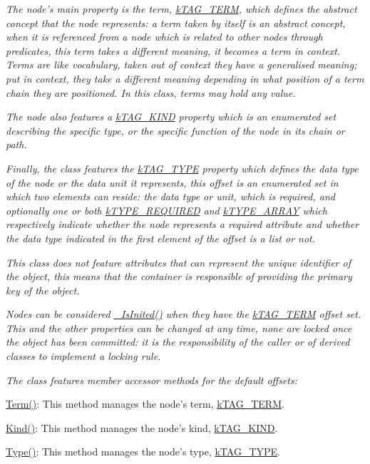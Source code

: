 {\itshape The node's main property is the term, \hyperlink{}{k\-T\-A\-G\-\_\-\-T\-E\-R\-M}, which defines the abstract concept that the node represents\-: a term taken by itself is an abstract concept, when it is referenced from a node which is related to other nodes through predicates, this term takes a different meaning, it becomes a term in context. Terms are like vocabulary, taken out of context they have a generalised meaning; put in context, they take a different meaning depending in what position of a term chain they are positioned. In this class, terms may hold any value.}

{\itshape The node also features a \hyperlink{}{k\-T\-A\-G\-\_\-\-K\-I\-N\-D} property which is an enumerated set describing the specific type, or the specific function of the node in its chain or path.}

{\itshape Finally, the class features the \hyperlink{}{k\-T\-A\-G\-\_\-\-T\-Y\-P\-E} property which defines the data type of the node or the data unit it represents, this offset is an enumerated set in which two elements can reside\-: the data type or unit, which is required, and optionally one or both \hyperlink{}{k\-T\-Y\-P\-E\-\_\-\-R\-E\-Q\-U\-I\-R\-E\-D} and \hyperlink{}{k\-T\-Y\-P\-E\-\_\-\-A\-R\-R\-A\-Y} which respectively indicate whether the node represents a required attribute and whether the data type indicated in the first element of the offset is a list or not.}

{\itshape This class does not feature attributes that can represent the unique identifier of the object, this means that the container is responsible of providing the primary key of the object.}

{\itshape Nodes can be considered \hyperlink{}{\-\_\-\-Is\-Inited()} when they have the \hyperlink{}{k\-T\-A\-G\-\_\-\-T\-E\-R\-M} offset set. This and the other properties can be changed at any time, none are locked once the object has been committed\-: it is the responsibility of the caller or of derived classes to implement a locking rule.}

{\itshape The class features member accessor methods for the default offsets\-:}

{\itshape 
\begin{DoxyItemize}
\item \hyperlink{}{Term()}\-: This method manages the node's term, \hyperlink{}{k\-T\-A\-G\-\_\-\-T\-E\-R\-M}. 
\item \hyperlink{}{Kind()}\-: This method manages the node's kind, \hyperlink{}{k\-T\-A\-G\-\_\-\-K\-I\-N\-D}. 
\item \hyperlink{}{Type()}\-: This method manages the node's type, \hyperlink{}{k\-T\-A\-G\-\_\-\-T\-Y\-P\-E}. 
\end{DoxyItemize}}

